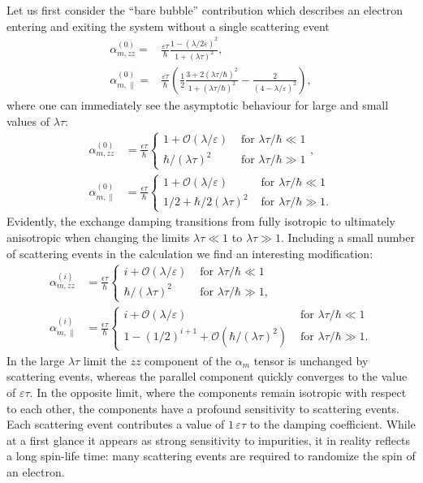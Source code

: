 Let us first consider the ``bare bubble'' contribution which describes an electron entering and exiting the system without a single scattering event
\begin{align}
    \alpha_{m,zz}^{(0)} = &\frac{\varepsilon\tau}{\hbar} \frac{1-(\lambda/2\varepsilon)^2}{1+(\lambda\tau)^2},\\
    \alpha_{m,\parallel}^{(0)} = &\frac{\varepsilon\tau}{\hbar}\left(\frac{1}{2}\frac{3+2(\lambda\tau/\hbar)^2}{1+(\lambda\tau/\hbar)^2}-\frac{2}{(4-\lambda/\varepsilon)^2}\right),
\end{align}
where one can immediately see the asymptotic behaviour for large and small values of $\lambda\tau$:
\begin{align}
    \alpha_{m,zz}^{(0)} &= \frac{\epsilon\tau}{\hbar}\begin{cases}
    1  +\mathcal{O}(\lambda/\varepsilon) &\text{ for }\lambda\tau/\hbar\ll1\\
    \hbar/(\lambda\tau)^2&\text{ for }\lambda\tau/\hbar\gg1
    \end{cases},\\
    \alpha_{m,\parallel}^{(0)} &= \frac{\epsilon\tau}{\hbar}\begin{cases}
    1  +\mathcal{O}(\lambda/\varepsilon) &\text{ for }\lambda\tau/\hbar\ll1\\
    1/2 + \hbar/2(\lambda\tau)^2&\text{ for }\lambda\tau/\hbar\gg1.
    \end{cases}
\end{align}
Evidently, the exchange damping transitions from fully isotropic to ultimately anisotropic when changing the limits $\lambda\tau\ll1$ to $\lambda\tau\gg1$. 
Including a small number of scattering events in the calculation we find an interesting modification:
\begin{align}
    \alpha_{m,zz}^{(i)} &= \frac{\epsilon\tau}{\hbar}\begin{cases}
    i + \mathcal{O}(\lambda/\varepsilon) &\text{ for }\lambda\tau/\hbar\ll1\\
    \hbar/(\lambda\tau)^2&\text{ for }\lambda\tau/\hbar\gg1,
    \end{cases}\\
    \alpha_{m,\parallel}^{(i)} & = \frac{\epsilon\tau}{\hbar}\begin{cases}
    i + \mathcal{O}(\lambda/\varepsilon) &\text{ for }\lambda\tau/\hbar\ll1\\
    1-(1/2)^{i+1}+\mathcal{O}(\hbar/(\lambda\tau)^2)&\text{ for }\lambda\tau/\hbar\gg1.
    \end{cases}
\end{align}
In the large $\lambda\tau$ limit the $zz$ component of the $\alpha_m$ tensor is unchanged by scattering events, whereas the parallel component quickly converges to the value of $\varepsilon\tau$. In the opposite limit, where the components remain isotropic with respect to each other, the components have a profound sensitivity to scattering events. Each scattering event contributes a value of $1\,\varepsilon\tau$ to the damping coefficient. While at a first glance it appears as strong sensitivity to impurities, it in reality reflects a long spin-life time: many scattering events are required to randomize the spin of an electron. 

